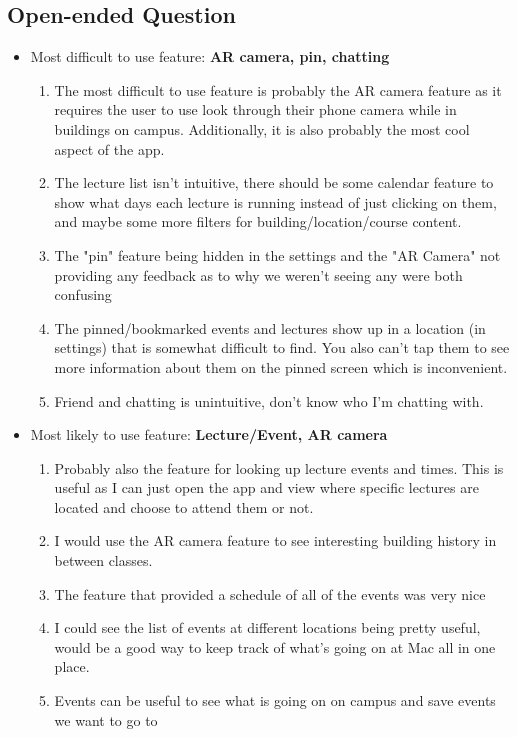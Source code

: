 \documentclass[12pt, titlepage]{article}
\begin{document}
\subsection{Open-ended Question}
\begin{itemize}
\item Most difficult to use feature: \textbf{AR camera, pin, chatting}
\begin{enumerate}
\item The most difficult to use feature is probably the AR camera feature as it requires the user to use look through their phone camera while in buildings on campus. Additionally, it is also probably the most cool aspect of the app.
\item The lecture list isn't intuitive, there should be some calendar feature to show what days each lecture is running instead of just clicking on them, and maybe some more filters for building/location/course content.
\item The "pin" feature being hidden in the settings and the "AR Camera" not providing any feedback as to why we weren't seeing any were both confusing
\item The pinned/bookmarked events and lectures show up in a location (in settings) that is somewhat difficult to find. You also can't tap them to see more information about them on the pinned screen which is inconvenient.
\item Friend and chatting is unintuitive, don't know who I'm chatting with.
\end{enumerate}
\item Most likely to use feature: \textbf{Lecture/Event, AR camera}
\begin{enumerate}
\item Probably also the feature for looking up lecture events and times. This is useful as I can just open the app and view where specific lectures are located and choose to attend them or not.
\item I would use the AR camera feature to see interesting building history in between classes.
\item The feature that provided a schedule of all of the events was very nice
\item I could see the list of events at different locations being pretty useful, would be a good way to keep track of what's going on at Mac all in one place.
\item Events can be useful to see what is going on on campus and save events we want to go to
\end{enumerate}
\end{itemize}
\end{document}
